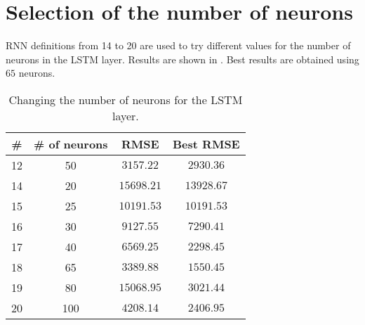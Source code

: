 \section{Selection of the number of neurons}\label{sec:rnnneurons}

RNN definitions from 14 to 20 are used to try different values for the number
of neurons in the LSTM layer. Results are shown in .
Best results are obtained using \(65\) neurons.

\begin{table}[hbtp]
	\centering
	\begin{tabular}{|c|c|c|c|}
		\toprule
		\# & \# of neurons & RMSE & Best RMSE \\
		\midrule
		12 & 50 & \(3157.22\) & \(2930.36\) \\
		14 & 20 & \(15698.21\) & \(13928.67\) \\
		15 & 25 & \(10191.53\) & \(10191.53\) \\
		16 & 30 & \(9127.55\) & \(7290.41\) \\
		17 & 40 & \(6569.25\) & \(2298.45\) \\
		18 & 65 & \(3389.88\) & \(1550.45\) \\
		19 & 80 & \(15068.95\) & \(3021.44\) \\
		20 & 100 & \(4208.14\) & \(2406.95\) \\
		\bottomrule
	\end{tabular}
	\caption{Changing the number of neurons for the LSTM
	layer.}\label{table:rnnneurons}
\end{table}
